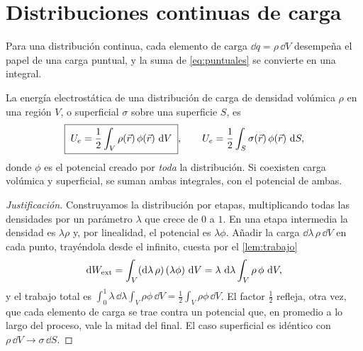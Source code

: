 \section{Distribuciones continuas de carga}\label{sec:continuas}

Para una distribución continua, cada elemento de carga $\dd q=\rho\,\dd V$ desempeña el papel de una carga puntual, y la suma de
\eqref{eq:puntuales} se convierte en una integral.

\begin{proposicion}\label{prop:continua}
La energía electrostática de una distribución de carga de densidad volúmica $\rho$ en una región $V$, o superficial $\sigma$ sobre una
superficie $S$, es
\begin{equation}\label{eq:continua}
  \boxed{\;U_e=\frac12\int_V\rho(\vec r)\,\phi(\vec r)\,\mathop{}\!\mathrm{d} V\;},\qquad U_e=\frac12\int_S\sigma(\vec r)\,\phi(\vec r)\,\mathop{}\!\mathrm{d} S ,
\end{equation}
donde $\phi$ es el potencial creado por \emph{toda} la distribución. Si coexisten carga volúmica y superficial, se suman ambas
integrales, con el potencial de ambas.
\end{proposicion}

\begin{proof}[Justificación]
Construyamos la distribución por etapas, multiplicando todas las densidades por un parámetro $\lambda$ que crece de $0$ a $1$. En
una etapa intermedia la densidad es $\lambda\rho$ y, por linealidad, el potencial es $\lambda\phi$. Añadir la carga $\dd\lambda\,\rho\,\dd V$ en cada
punto, trayéndola desde el infinito, cuesta por el \cref{lem:trabajo}
\[
  \mathop{}\!\mathrm{d}W_{\mathrm{ext}}=\int_V(\mathop{}\!\mathrm{d}\lambda\,\rho)\,(\lambda\phi)\,\mathop{}\!\mathrm{d} V=\lambda\,\mathop{}\!\mathrm{d}\lambda\int_V\rho\,\phi\,\mathop{}\!\mathrm{d} V ,
\]
y el trabajo total es $\int_0^1\lambda\,\dd\lambda\int_V\rho\phi\,\dd V=\frac12\int_V\rho\phi\,\dd V$. El factor $\frac12$ refleja, otra vez, que cada elemento de carga
se trae contra un potencial que, en promedio a lo largo del proceso, vale la mitad del final. El caso superficial es idéntico con
$\rho\,\dd V\to\sigma\,\dd S$.
\end{proof}

